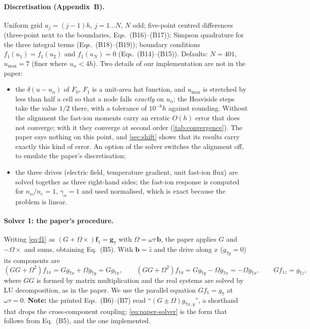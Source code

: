 \documentclass[11pt,a4paper]{article}
\newcommand{\ot}{\omega\tau}
\begin{document}
\paragraph{Discretisation (Appendix~B).} Uniform grid $u_j=(j-1)h$, $j=1\dots N$, $N$ odd; five-point centred
differences (three-point next to the boundaries, Eqs.~(B16)--(B17)); Simpson quadrature for the three integral terms
(Eqs.~(B18)--(B19)); boundary conditions $f_1(u_1)=f_1(u_2)$ and $f_1(u_N)=0$ (Eqs.~(B14)--(B15)). Defaults: $N=401$,
$u_{\max}=7$ (finer where $u_\alpha<4h$). Two details of our implementation are not in the paper:
\begin{itemize}
   \item the $\delta(u-u_\alpha)$ of $F_0$, $F_1$ is a unit-area hat function, and $u_{\max}$ is stretched by less than
         half a cell so that a node falls \emph{exactly} on $u_\alpha$; the Heaviside steps take the value $1/2$ there,
         with a tolerance of $10^{-8}h$ against rounding. Without the alignment the fast-ion moments carry an erratic
         $O(h)$ error that does not converge; with it they converge at second order (\cref{tab:convergence}). The paper
         says nothing on this point, and \cref{sec:shift} shows that its results carry exactly this kind of error. An
         option of the solver switches the alignment off, to emulate the paper's discretisation;
   \item the three drives (electric field, temperature gradient, unit fast-ion flux) are solved together as three
         right-hand sides; the fast-ion response is computed for $n_\alpha/n_e=1$, $\gamma_\alpha=1$ and used
         normalised, which is exact because the problem is linear.
\end{itemize}

\paragraph{Solver 1: the paper's procedure.} Writing \cref{eq:f1} as $(G+\Omega\times)\mathbf f_1=\mathbf g_7$ with
$\Omega=\ot\,\mathbf b$, the paper applies $G$ and $-\Omega\times$ and sums, obtaining Eq.~(B5). With $\mathbf b=\hat z$
and the drive along $x$ ($g_{7y}=0$) its components are
\begin{equation}
   (GG+\Omega^2)f_{1x} = G g_{7x} + \Omega g_{7y} = G g_{7x}, \qquad
   (GG+\Omega^2)f_{1y} = G g_{7y} - \Omega g_{7x} = -\Omega g_{7x}, \qquad
   G f_{1z} = g_{7z}, \label{eq:paper-solver}
\end{equation}
where $GG$ is formed by matrix multiplication and the real systems are solved by LU decomposition, as in the paper. We
use the parallel equation $Gf_1=g_7$ at $\ot=0$. \textbf{Note:} the printed Eqs.~(B6)--(B7) read ``$(G\pm\Omega)g_{7x,y}$'',
a shorthand that drops the cross-component coupling; \cref{eq:paper-solver} is the form that follows from Eq.~(B5), and
the one implemented.
\end{document}
